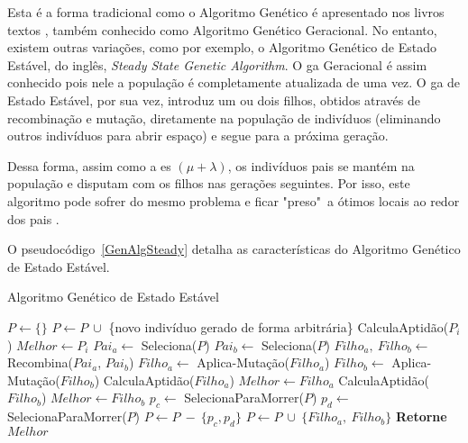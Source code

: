 Esta é a forma tradicional como o Algoritmo Genético é apresentado nos livros 
textos \citep{Luke2013Metaheuristics}, também conhecido como Algoritmo Genético 
Geracional. No entanto, existem outras variações, como por exemplo, o Algoritmo 
Genético de Estado Estável, do inglês, \textit{Steady State Genetic Algorithm}.
O \ac{ga} Geracional é assim conhecido pois nele a população é completamente 
atualizada de uma vez. O \ac{ga} de Estado Estável, por sua vez, introduz um 
ou dois filhos, obtidos através de recombinação e mutação, diretamente na 
população de indivíduos (eliminando outros indivíduos para abrir espaço) e segue 
para a próxima geração.

Dessa forma, assim como a \ac{es} $( \mu + \lambda )$, os indivíduos pais se 
mantém na população e disputam com os filhos nas gerações seguintes. Por isso, 
este algoritmo pode sofrer do mesmo problema e ficar "preso"\ a ótimos locais ao 
redor dos pais \citep{Luke2013Metaheuristics}.

O pseudocódigo~\ref{GenAlgSteady} detalha as características do Algoritmo 
Genético de Estado Estável.

\begin{algorithm}[h]                      %
	\caption{Algoritmo Genético de Estado Estável}          %
	\label{GenAlgSteady}                           %
	\begin{algorithmic}                   %
		\State $P \gets \{\} $
			\State $P \gets P \ \cup $ \{novo indivíduo gerado de forma arbitrária\} 
		\EndFor
			\State CalculaAptidão($P_{i}$)
				\State $Melhor \gets P_{i}$
			\EndIf
		\EndFor
		\Repeat
			\State $Pai_{a} \gets $ Seleciona($P$)
			\State $Pai_{b} \gets $ Seleciona($P$)
			\State $Filho_{a},\ Filho_{b} \gets $ Recombina($Pai_{a}$, $Pai_{b}$)
			\State $Filho_{a} \gets $ Aplica-Mutação($Filho_{a}$)
			\State $Filho_{b} \gets $ Aplica-Mutação($Filho_{b}$)
			\State CalculaAptidão($Filho_{a}$)
				\State $Melhor \gets Filho_{a}$
			\EndIf
			\State CalculaAptidão($Filho_{b}$)
				\State $Melhor \gets Filho_{b}$
			\EndIf
			\State $p_{c} \gets $ SelecionaParaMorrer($P$) 
			\State $p_{d} \gets $ SelecionaParaMorrer($P$) 
			\State $P \gets P\ -\ \{p_{c},p_{d}\}$
			\State $P \gets P\ \cup\ \{Filho_{a},\ Filho_{b}\}$
		\State \textbf{Retorne} $Melhor$
		\EndProcedure
	\end{algorithmic}
\end{algorithm}

